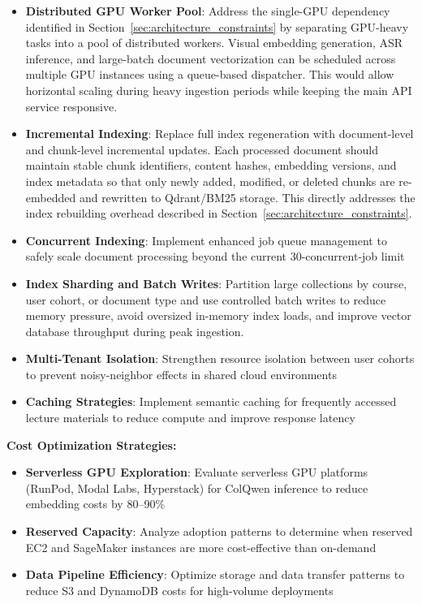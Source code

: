 \begin{itemize}
    \item \textbf{Distributed GPU Worker Pool}: Address the single-GPU dependency identified in Section~\ref{sec:architecture_constraints} by separating GPU-heavy tasks into a pool of distributed workers. Visual embedding generation, ASR inference, and large-batch document vectorization can be scheduled across multiple GPU instances using a queue-based dispatcher. This would allow horizontal scaling during heavy ingestion periods while keeping the main API service responsive.
    \item \textbf{Incremental Indexing}: Replace full index regeneration with document-level and chunk-level incremental updates. Each processed document should maintain stable chunk identifiers, content hashes, embedding versions, and index metadata so that only newly added, modified, or deleted chunks are re-embedded and rewritten to Qdrant/BM25 storage. This directly addresses the index rebuilding overhead described in Section~\ref{sec:architecture_constraints}.
    \item \textbf{Concurrent Indexing}: Implement enhanced job queue management to safely scale document processing beyond the current 30-concurrent-job limit
    \item \textbf{Index Sharding and Batch Writes}: Partition large collections by course, user cohort, or document type and use controlled batch writes to reduce memory pressure, avoid oversized in-memory index loads, and improve vector database throughput during peak ingestion.
    \item \textbf{Multi-Tenant Isolation}: Strengthen resource isolation between user cohorts to prevent noisy-neighbor effects in shared cloud environments
    \item \textbf{Caching Strategies}: Implement semantic caching for frequently accessed lecture materials to reduce compute and improve response latency
\end{itemize}

\textbf{Cost Optimization Strategies:}

\begin{itemize}
    \item \textbf{Serverless GPU Exploration}: Evaluate serverless GPU platforms (RunPod, Modal Labs, Hyperstack) for ColQwen inference to reduce embedding costs by 80--90\%
    \item \textbf{Reserved Capacity}: Analyze adoption patterns to determine when reserved EC2 and SageMaker instances are more cost-effective than on-demand
    \item \textbf{Data Pipeline Efficiency}: Optimize storage and data transfer patterns to reduce S3 and DynamoDB costs for high-volume deployments
\end{itemize}

